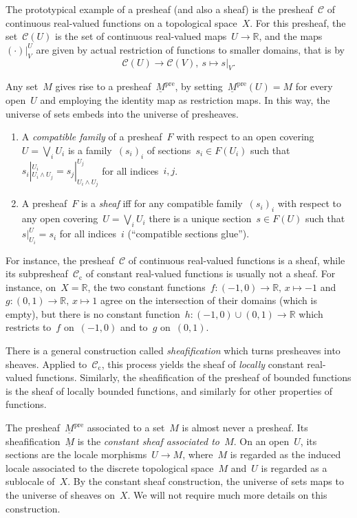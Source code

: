 \documentclass{ws-rv9x6}
\newcommand{\C}{\mathcal{C}}
\newcommand{\RR}{\mathbb{R}}
\renewcommand{\_}{\mathpunct{.}}
\newcommand{\?}{\,{:}\,}
\begin{document}
The prototypical example of a presheaf (and also a sheaf) is the presheaf~$\C$ of
continuous real-valued functions on a topological space~$X$. For this presheaf, the
set~$\C(U)$ is the set of continuous real-valued maps~$U \to \RR$, and the
maps~$(\cdot)|^U_V$ are given by actual restriction of functions to smaller
domains, that is by
\[ \C(U) \longrightarrow \C(V),\ s \longmapsto s|_V. \]

Any set~$M$ gives rise to a presheaf~$\underline{M}^\mathrm{pre}$, by
setting~$\underline{M}^\mathrm{pre}(U) = M$ for every open~$U$ and employing
the identity map as restriction maps. In this way, the universe of sets embeds
into the universe of presheaves.

\begin{definition}
\begin{enumerate}
\item A \emph{compatible family} of a presheaf~$F$ with respect to an open
covering~$U = \bigvee_i U_i$ is a family~$(s_i)_i$ of sections~$s_i \in F(U_i)$
such that~$s_i|^{U_i}_{U_i \wedge U_j} = s_j|^{U_j}_{U_i \wedge U_j}$ for all
indices~$i,j$.
\item A presheaf~$F$ is a \emph{sheaf}
iff for any compatible family~$(s_i)_i$ with respect to any open covering~$U =
\bigvee_i U_i$ there is a unique section~$s \in F(U)$ such
that~$s|^U_{U_i} = s_i$ for all indices~$i$ (``compatible sections glue'').
\end{enumerate}
\end{definition}

For instance, the presheaf~$\C$ of continuous real-valued functions is a sheaf,
while its subpresheaf~$\C_\text{c}$ of constant real-valued functions is
usually not a sheaf. For instance, on~$X = \RR$, the two constant functions~$f
: (-1,0) \to \RR,\,x \mapsto -1$ and~$g : (0,1) \to \RR,\,x \mapsto 1$ agree on
the intersection of their domains (which is empty), but there is no constant
function~$h : (-1,0) \cup (0,1) \to \RR$ which restricts to~$f$ on~$(-1,0)$ and
to~$g$ on~$(0,1)$.

There is a general construction called \emph{sheafification} which turns
presheaves into sheaves. Applied to~$\C_\text{c}$, this process yields the
sheaf of \emph{locally} constant real-valued functions. Similarly, the
sheafification of the presheaf of bounded functions is the sheaf of locally
bounded functions, and similarly for other properties of functions.

The presheaf~$\underline{M}^\mathrm{pre}$ associated to a set~$M$ is almost
never a presheaf. Its sheafification~$\underline{M}$ is the \emph{constant sheaf associated
to~$M$}\label{page:constant-sheaf}. On an open~$U$, its sections are the locale
morphisms~$U \to M$, where~$M$ is regarded as the induced locale associated to
the discrete topological space~$M$ and~$U$ is regarded as a sublocale of~$X$.
By the constant sheaf construction, the universe of sets maps to the universe
of sheaves on~$X$. We will not require much more details on this construction.
\end{document}
